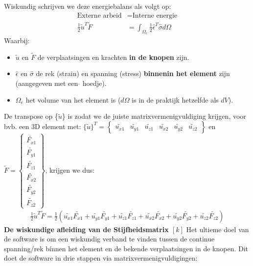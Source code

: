 \documentclass[a4paper,11pt,twoside]{report}
\begin{document}
Wiskundig schrijven we deze energiebalans als volgt op:
\begin{align*}
    \text{Externe arbeid}             & = \text{Interne energie}                                            \\
    \frac{1}{2} \tilde{u}^T \tilde{F} & = \int_{\Omega_e} \frac{1}{2} \hat{\epsilon}^T \hat{\sigma} d\Omega
\end{align*}
Waarbij:
\begin{itemize}
    \item $\tilde{u}$ en $\tilde{F}$ de verplaatsingen en krachten \textbf{in de knopen} zijn.
    \item $\hat{\epsilon}$ en $\hat{\sigma}$ de rek (strain) en spanning (stress) \textbf{binnenin
              het element} zijn (aangegeven met een $\hat{}$ hoedje).
    \item $\Omega_e$ het volume van het element is ($d\Omega$ is in de praktijk hetzelfde als $dV$).
\end{itemize}
De transpose op \{$\tilde{u}$\} is zodat we de juiste matrixvermenigvuldiging krijgen, voor bvb. een
3D element met:
$\{\tilde{u}\}^T = \begin{Bmatrix} \tilde{u_{x1}} & \tilde{u_{y1}} & \tilde{u_{z1}} & \tilde{u_{x2}} & \tilde{u_{y2}} & \tilde{u_{z2}} \end{Bmatrix}$
en
$\tilde{F} = \begin{Bmatrix} \tilde{F_{x1}} \\ \tilde{F_{y1}} \\ \tilde{F_{z1}} \\ \tilde{F_{x2}} \\ \tilde{F_{y2}} \\ \tilde{F_{z2}} \end{Bmatrix}$,
krijgen we dus:
\begin{align*}
    \frac{1}{2} \tilde{u}^T \tilde{F}
    = \frac{1}{2} (\tilde{u_{x1}} \tilde{F_{x1}} + \tilde{u_{y1}} \tilde{F_{y1}} + \tilde{u_{z1}} \tilde{F_{z1}} + \tilde{u_{x2}} \tilde{F_{x2}} + \tilde{u_{y2}} \tilde{F_{y2}} + \tilde{u_{z2}} \tilde{F_{z2}})
\end{align*}
\textbf{De wiskundige afleiding van de Stijfheidsmatrix $[k]$} \newline
Het ultieme doel van de software is om een wiskundig verband te vinden tussen de continue
spanning/rek bínnen het element en de bekende verplaatsingen in de knopen. Dit doet de software in
drie stappen via matrixvermenigvuldigingen:
\end{document}
